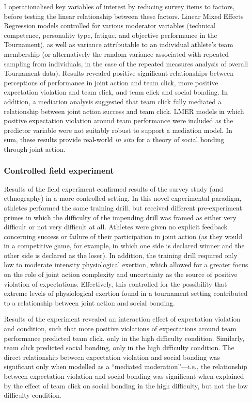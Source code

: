 I operationalised key variables of interest by reducing survey items to factors, before testing the linear relationship between these factors.  Linear Mixed Effects Regression models controlled for various moderator variables (technical competence, personality type, fatigue, and objective performance in the Tournament), as well as variance attributable to an individual athlete's team membership (or alternatively the random variance associated with repeated sampling from individuals, in the case of the repeated measures analysis of overall Tournament data).  Results revealed positive significant relationships between perceptions of performance in joint action and team click, more positive expectation violation and team click, and team click and social bonding.  In addition, a mediation analysis suggested that team click fully mediated a relationship between joint action success and team click.  LMER models in which positive expectation violation around team performance were included as the predictor variable were not suitably robust to support a mediation model.  In sum, these results provide real-world \textit{in situ} for a
theory of social bonding through joint action.

\subsubsection{Controlled field experiment}
Results of the field experiment confirmed results of the survey study (and ethnography) in a more controlled setting.  In this novel experimental paradigm, athletes performed the same training drill, but received different pre-experiment primes in which the difficulty of the impending drill was framed as either very difficult or not very difficult at all.  Athletes were given no explicit feedback concerning success or failure of their participation in joint action (as they would in a competitive game, for example, in which one side is declared winner and the other side is declared as the loser). In addition, the training drill required only low to moderate intensity physiological exertion, which allowed for a greater focus on the role of joint action complexity and uncertainty as the source of positive violation of expectations.  Effectively, this controlled for the possibility that extreme levels of physiological exertion found in a tournament setting contributed to a relationship between joint action and social bonding.

Results of the experiment revealed an interaction effect of expectation violation and condition, such that more positive violations of expectations around team performance predicted team click, only in the high difficulty condition.  Similarly, team click predicted social bonding, only in the high difficulty condition.  The direct relationship between expectation violation and social bonding was significant only when modelled as a ``mediated moderation''---i.e., the relationship between expectation violation and social bonding was significant when explained by the effect of team click on social bonding in the high difficulty, but not the low difficulty condition.


